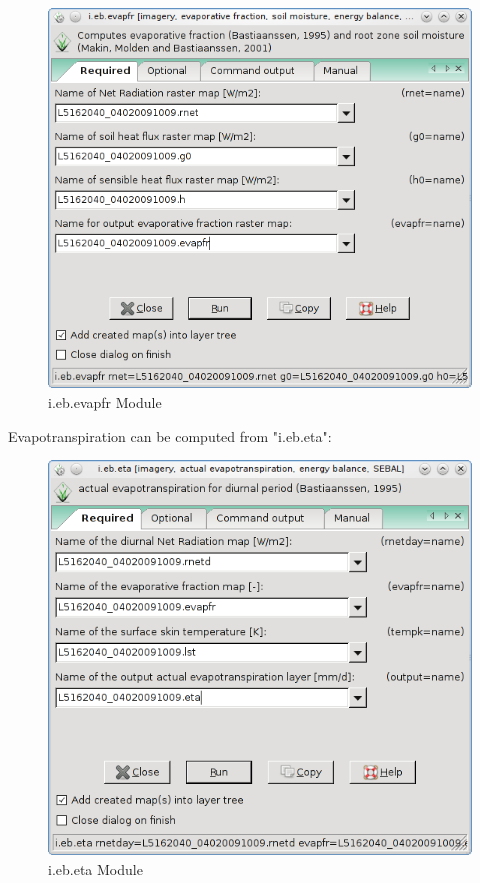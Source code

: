 \begin{figure}[htbp]
   \centering
   \includegraphics[scale=0.4]{gipe028.png}
   \caption{i.eb.evapfr Module}
   \label{fig:gipe028}
\end{figure}

Evapotranspiration can be computed from "i.eb.eta":\newline

\begin{figure}[htbp]
   \centering
   \includegraphics[scale=0.4]{gipe029.png}
   \caption{i.eb.eta Module}
   \label{fig:gipe029}
\end{figure}

